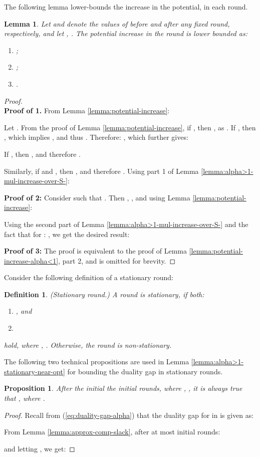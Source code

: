 \documentclass[11pt]{article}
\newtheorem{lemma}[theorem]{Lemma}
\newtheorem{proposition}[theorem]{Proposition}
\newtheorem{definition}[theorem]{Definition}
\begin{document}
The following lemma lower-bounds the increase in the potential, in each round.
\begin{lemma}\label{lemma:potential-increase-alpha>1}
Let  and  denote the values of  before and after any fixed round, respectively, and let , . The potential increase in the round is lower bounded as:
\begin{enumerate}[noitemsep, topsep=5pt]
\item ;
\item ;
\item .
\end{enumerate}
\end{lemma}
\begin{proof}
\\
\noindent\textbf{Proof of 1.} From Lemma \ref{lemma:potential-increase}:

Let . 
From the proof of Lemma \ref{lemma:potential-increase}, if , then , as . If , then , which implies , and thus .
Therefore: , which further gives:

If , then , and therefore .

Similarly, if  and , then , and therefore . Using part 1 of Lemma \ref{lemma:alpha>1-mul-increase-over-S-}:


\noindent\textbf{Proof of 2:} Consider  such that . Then , , and using Lemma \ref{lemma:potential-increase}:

Using the second part of Lemma \ref{lemma:alpha>1-mul-increase-over-S-} and the fact that for : , we get the desired result:


\noindent\textbf{Proof of 3:} The proof is equivalent to the proof of Lemma \ref{lemma:potential-increase-alpha<1}, part 2, and is omitted for brevity. 
\end{proof}

Consider the following definition of a stationary round:
\begin{definition}\label{def:stationary-round}
(Stationary round.) A round is stationary, if both:
\begin{enumerate}[topsep = 5pt]
\item , and
\item 
\end{enumerate}
hold, where , . Otherwise, the round is non-stationary.
\end{definition}




The following two technical propositions are used in Lemma \ref{lemma:alpha>1-stationary-near-opt} for bounding the duality gap in stationary rounds.
\begin{proposition}\label{prop:alpha>1-duality-gap}
After the initial the initial  rounds, where , , it is always true that , where .
\end{proposition}
\begin{proof}
Recall from (\ref{eq:duality-gap-alpha}) that the duality gap for  in  is given as: 

From Lemma \ref{lemma:approx-comp-slack}, after at most initial  rounds:

and letting , we get:

\end{proof}
\end{document}
